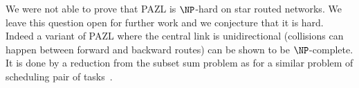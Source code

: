 \documentclass[10pt, conference, letterpaper]{IEEEtran}
\begin{document}
       We were not able to prove that PAZL is $\NP$-hard on star routed networks.
       We leave this question open for further work and we conjecture that it is hard. 
       Indeed a variant of PAZL where the central link is unidirectional (collisions can happen between forward and backward routes) can be shown to be $\NP$-complete. It is done by a reduction from the subset sum problem as for a similar problem of scheduling pair of tasks~\cite{orman1997complexity}. 
       
  
  
  
%
\end{document}
